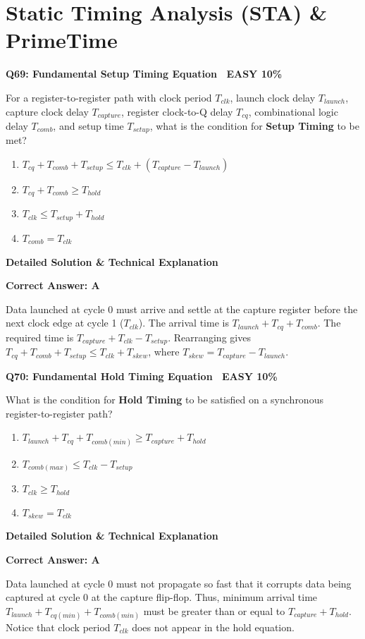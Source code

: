 \documentclass[11pt,a4paper]{article}
\newcommand{\badgeeasy}{{\color{white}\colorbox{easygreen}{\bfseries\sffamily\tiny\ EASY 10\%\ }}}
\newenvironment{qbox}[2]{%
  \begin{mdframed}[style=qstyle]%
  {\bfseries\sffamily\color{primaryblue}#1 \hfill #2}\par\vspace{2pt}%
}{%
  \end{mdframed}%
}
\newenvironment{ansbox}{%
  \begin{mdframed}[style=ansstyle]%
  {\bfseries\sffamily\color{ansgreen}\small Detailed Solution \& Technical Explanation}\par\vspace{2pt}\small%
}{%
  \end{mdframed}%
}
\begin{document}
\section{Static Timing Analysis (STA) \& PrimeTime}

\begin{qbox}{Q69: Fundamental Setup Timing Equation}{\badgeeasy}
For a register-to-register path with clock period $T_{clk}$, launch clock delay $T_{launch}$, capture clock delay $T_{capture}$, register clock-to-Q delay $T_{cq}$, combinational logic delay $T_{comb}$, and setup time $T_{setup}$, what is the condition for \textbf{Setup Timing} to be met?
\begin{enumerate}[label=\textbf{\Alph*.}]
  \item $T_{cq} + T_{comb} + T_{setup} \le T_{clk} + (T_{capture} - T_{launch})$
  \item $T_{cq} + T_{comb} \ge T_{hold}$
  \item $T_{clk} \le T_{setup} + T_{hold}$
  \item $T_{comb} = T_{clk}$
\end{enumerate}
\end{qbox}
\begin{ansbox}
\textbf{Correct Answer: A}

Data launched at cycle 0 must arrive and settle at the capture register before the next clock edge at cycle 1 ($T_{clk}$). The arrival time is $T_{launch} + T_{cq} + T_{comb}$. The required time is $T_{capture} + T_{clk} - T_{setup}$. Rearranging gives $T_{cq} + T_{comb} + T_{setup} \le T_{clk} + T_{skew}$, where $T_{skew} = T_{capture} - T_{launch}$.
\end{ansbox}

\begin{qbox}{Q70: Fundamental Hold Timing Equation}{\badgeeasy}
What is the condition for \textbf{Hold Timing} to be satisfied on a synchronous register-to-register path?
\begin{enumerate}[label=\textbf{\Alph*.}]
  \item $T_{launch} + T_{cq} + T_{comb(min)} \ge T_{capture} + T_{hold}$
  \item $T_{comb(max)} \le T_{clk} - T_{setup}$
  \item $T_{clk} \ge T_{hold}$
  \item $T_{skew} = T_{clk}$
\end{enumerate}
\end{qbox}
\begin{ansbox}
\textbf{Correct Answer: A}

Data launched at cycle 0 must not propagate so fast that it corrupts data being captured at cycle 0 at the capture flip-flop. Thus, minimum arrival time $T_{launch} + T_{cq(min)} + T_{comb(min)}$ must be greater than or equal to $T_{capture} + T_{hold}$. Notice that clock period $T_{clk}$ does not appear in the hold equation.
\end{ansbox}
\end{document}
